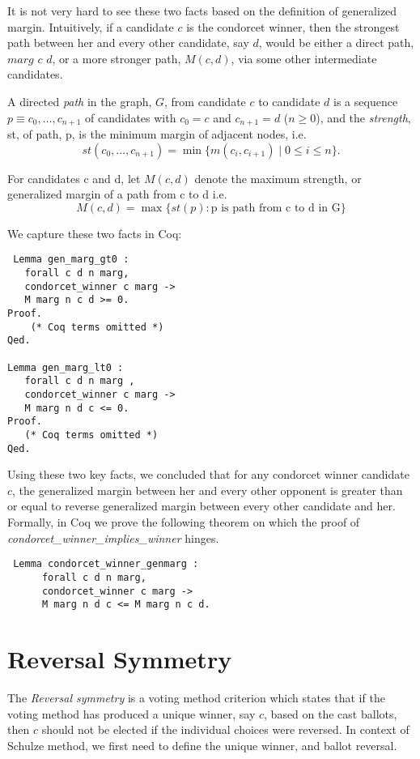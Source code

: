  
 It is not very hard to see these two facts based on the definition of generalized margin. Intuitively, 
 if a candidate $c$ is the condorcet winner, then the strongest path between her and every other 
 candidate, say $d$,  would be either a direct path, $marg$ $c$ $d$, or a more stronger path, $M (c, d)$, 
 via some other intermediate candidates. 
  
 \begin{displayquote}
 A directed \emph{path} in the graph, $G$, from
candidate $c$ to candidate $d$ is a sequence $p \equiv c_0, \dots, c_{n+1}$
of candidates with $c_0 = c$ and $c_{n+1} = d$ ($n \geq 0$), and the
\emph{strength}, st, of path, p, is the minimum margin of adjacent
nodes, i.e.
\[ st(c_0, \dots, c_{n+1}) = \min \lbrace m (c_i, c_{i+1}) \mid 0
\leq i \leq n \rbrace. \]
\item For candidates c and d, let $M(c, d)$ denote the maximum strength, or generalized margin of a path
	from c to d i.e. 
	\[ M(c, d) = \max \lbrace st (p) : \text{p is path from c to d in G} \rbrace\]
  
   \end{displayquote}
   
 We capture these two facts in Coq:
 
 \begin{verbatim}
 Lemma gen_marg_gt0 :
   forall c d n marg, 
   condorcet_winner c marg -> 
   M marg n c d >= 0.
Proof. 
    (* Coq terms omitted *)
Qed.

Lemma gen_marg_lt0 :
   forall c d n marg , 
   condorcet_winner c marg ->
   M marg n d c <= 0.
Proof.
   (* Coq terms omitted *)
Qed.
\end{verbatim}   
 
 Using these two key facts, we concluded that for any condorcet winner candidate $c$, 
 the generalized margin between her and every other opponent is greater than or equal 
 to reverse generalized margin between every other candidate and her.  Formally, 
 in Coq we prove the following theorem on which  the proof of 
 \textit{condorcet\_winner\_implies\_winner} hinges. 
 
\begin{verbatim}
 Lemma condorcet_winner_genmarg :
      forall c d n marg, 
      condorcet_winner c marg -> 
      M marg n d c <= M marg n c d.  
\end{verbatim}
   
\section{Reversal Symmetry}
 The \textit{Reversal symmetry} is a voting method criterion which states that if the voting method has produced a unique 
 winner, say $c$, based on the cast ballots, then $c$ should not be elected if the individual choices were 
 reversed. In context of Schulze method, we first need to define the unique winner, and ballot reversal. 
 
